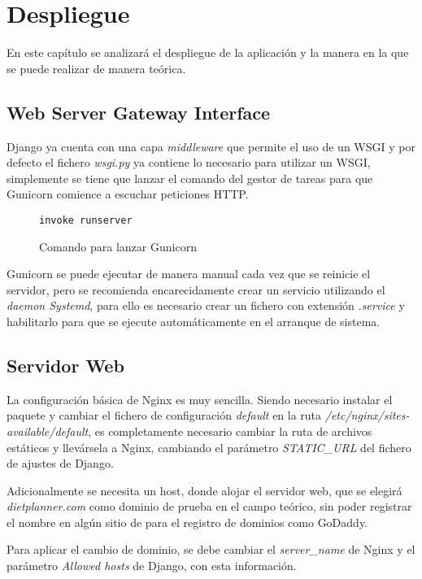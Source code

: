 \chapter{Despliegue}
En este capítulo se analizará el despliegue de la aplicación y la manera en la que se puede realizar de manera teórica.

\section{Web Server Gateway Interface}
Django ya cuenta con una capa \emph{middleware} que permite el uso de un WSGI y por defecto el fichero \emph{wsgi.py} ya contiene lo necesario para utilizar un WSGI, simplemente se tiene que lanzar el comando del gestor de tareas para que Gunicorn comience a escuchar peticiones HTTP. 
\begin{figure}[H!]
    \begin{lstlisting}[style=C, caption={Métodos de la base de datos utilizados para buscar recetas por ingredientes}]
        invoke runserver
    \end{lstlisting}
        \caption{Comando para lanzar Gunicorn}
        \label{cmd:gunicorn}
    \end{figure}

Gunicorn se puede ejecutar de manera manual cada vez que se reinicie el servidor, pero se recomienda encarecidamente crear un servicio utilizando el \emph{daemon Systemd}, para ello es necesario crear un fichero con extensión \emph{.service} y habilitarlo para que se ejecute automáticamente en el arranque de sistema.

\section{Servidor Web}
La configuración básica de Nginx es muy sencilla. Siendo necesario instalar el paquete y cambiar el fichero de configuración \textit{default} en la ruta \textit{/etc/nginx/sites-available/default}, es completamente necesario cambiar la ruta de archivos estáticos y llevársela a Nginx, cambiando el parámetro \textit{STATIC\_URL} del fichero de ajustes de Django. 

Adicionalmente se necesita un host, donde alojar el servidor web, que se elegirá \textit{dietplanner.com} como dominio de prueba en el campo teórico, sin poder registrar el nombre en algún sitio de para el registro de dominios como GoDaddy.

Para aplicar el cambio de dominio, se debe cambiar el \textit{server_name} de Nginx y el parámetro \textit{Allowed hosts} de Django, con esta información.

